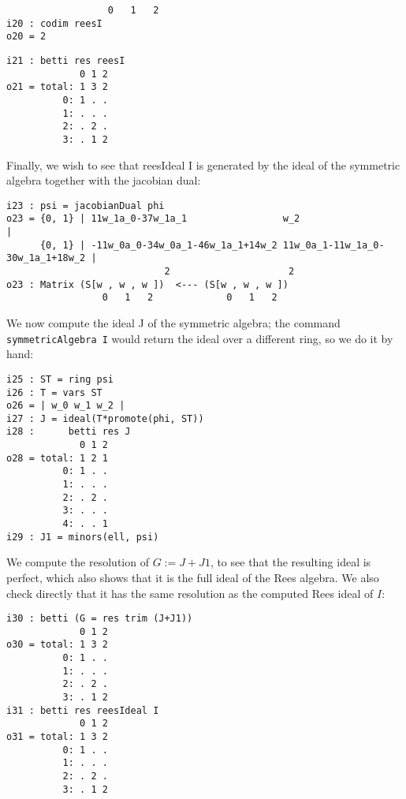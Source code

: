 \documentclass[twoside,12pt, leqno]{amsart}
\begin{document}
\begin{normalsize}
\begin{footnotesize}
\begin{verbatim}
                  0   1   2
i20 : codim reesI
o20 = 2
\end{verbatim}
 \goodbreak
\begin{verbatim}
i21 : betti res reesI
             0 1 2
o21 = total: 1 3 2
          0: 1 . .
          1: . . .
          2: . 2 .
          3: . 1 2
\end{verbatim}
\end{footnotesize}
Finally, we wish to see that reesIdeal I is generated by the ideal 
           of the symmetric algebra together with the jacobian dual:
\begin{footnotesize}
 \begin{verbatim}
i23 : psi = jacobianDual phi
o23 = {0, 1} | 11w_1a_0-37w_1a_1                 w_2                              |
      {0, 1} | -11w_0a_0-34w_0a_1-46w_1a_1+14w_2 11w_0a_1-11w_1a_0-30w_1a_1+18w_2 |
                            2                     2
o23 : Matrix (S[w , w , w ])  <--- (S[w , w , w ])
                 0   1   2             0   1   2
\end{verbatim}
\end{footnotesize}
We now compute the ideal J of the symmetric algebra; the command {\tt symmetricAlgebra I}
           would return the ideal over a different ring, so we do it by hand:
\begin{footnotesize}
 \begin{verbatim}
i25 : ST = ring psi
i26 : T = vars ST
o26 = | w_0 w_1 w_2 |
i27 : J = ideal(T*promote(phi, ST))
i28 :      betti res J
             0 1 2
o28 = total: 1 2 1
          0: 1 . .
          1: . . .
          2: . 2 .
          3: . . .
          4: . . 1
i29 : J1 = minors(ell, psi)
  \end{verbatim}
  \end{footnotesize}
We compute the resolution of $G := J+J1$, to see that the resulting ideal is perfect, which also shows that
it is the full ideal of the Rees algebra. We also check directly that it has the same resolution as the computed
Rees ideal of $I$:
\begin{footnotesize}
 \begin{verbatim}
i30 : betti (G = res trim (J+J1))
             0 1 2
o30 = total: 1 3 2
          0: 1 . .
          1: . . .
          2: . 2 .
          3: . 1 2
i31 : betti res reesIdeal I
             0 1 2
o31 = total: 1 3 2
          0: 1 . .
          1: . . .
          2: . 2 .
          3: . 1 2
  \end{verbatim}
  \end{footnotesize}


\end{normalsize}
\end{document}
